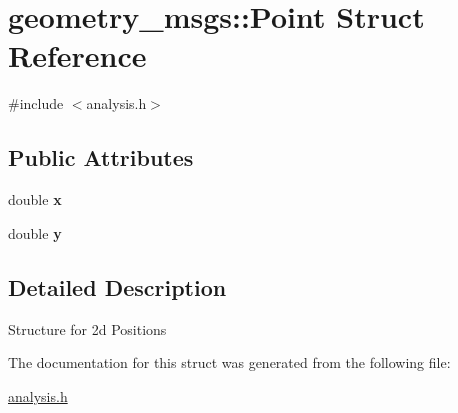 \hypertarget{structgeometry__msgs_1_1Point}{}\section{geometry\+\_\+msgs\+:\+:Point Struct Reference}
\label{structgeometry__msgs_1_1Point}


{\ttfamily \#include $<$analysis.\+h$>$}

\subsection*{Public Attributes}
\begin{DoxyCompactItemize}
\item 
\mbox{\label{structgeometry__msgs_1_1Point_a52ccd2ddf703b661ed049c2a41e1525f}} 
double {\bfseries x}
\item 
\mbox{\label{structgeometry__msgs_1_1Point_a8b028e43156db47fed28583d9b196d89}} 
double {\bfseries y}
\end{DoxyCompactItemize}


\subsection{Detailed Description}
Structure for 2d Positions 

The documentation for this struct was generated from the following file\+:\begin{DoxyCompactItemize}
\item 
\hyperlink{analysis_8h}{analysis.\+h}\end{DoxyCompactItemize}
